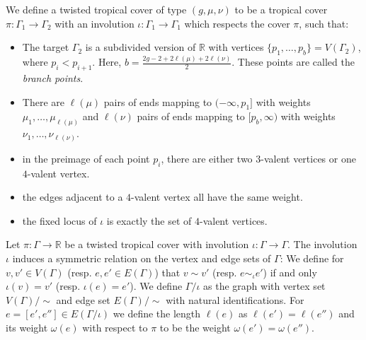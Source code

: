 \begin{defi}\label{def-twistedtropcover}
We define a twisted tropical cover of type $(g,\mu,\nu)$ to be a tropical cover $\pi\colon\Gamma_1\to\Gamma_2$ with an involution $\iota\colon\Gamma_1\to\Gamma_1$ which respects the cover $\pi$, such that:
\begin{itemize}
    \item The target $\Gamma_2$ is a subdivided version of $\mathbb{R}$ with vertices $\{p_1,\dots,p_b\}=V(\Gamma_2)$, where $p_i<p_{i+1}$. Here, $b=\frac{2g-2+2\ell(\mu)+2\ell(\nu)}{2}$. These points are called the \emph{branch points}.
    \item There are $\ell(\mu)$ pairs of ends mapping to $(-\infty,p_1]$ with weights $\mu_1,\dots,\mu_{\ell(\mu)}$ and $\ell(\nu)$ pairs of ends mapping to $[p_b,\infty)$ with weights $\nu_1,\ldots,\nu_{\ell(\nu)}$.
    \item in the preimage of each point $p_i$, there are either two $3$-valent vertices or one $4$-valent vertex.
    \item the edges adjacent to a $4$-valent vertex all have the same weight.
    \item the fixed locus of $\iota$ is exactly the set of $4$-valent vertices.
\end{itemize}
\end{defi}

\begin{defi}
Let $\pi\colon \Gamma\to \mathbb{R}$ be a twisted tropical cover with involution $\iota\colon\Gamma\to\Gamma$. The involution $\iota$ induces a symmetric relation on the vertex and edge sets of $\Gamma$: We define for $v,v'\in V(\Gamma)$  (resp. $e,e'\in E(\Gamma)$) that $v\sim v'$ (resp. $e\sim_\iota e'$) if and only $\iota(v)=v'$ (resp. $\iota(e)=e'$). We define $\Gamma/\iota$ as the graph with vertex set $V(\Gamma)/\sim$ and edge set $E(\Gamma)/\sim$ with natural identifications. For $e=[e',e'']\in E(\Gamma/\iota)$ we define the length $\ell(e)$ as $\ell(e')=\ell(e'')$ and its weight $\omega(e)$ with respect to $\pi$ to be the weight $\omega(e')=\omega(e'')$.
\end{defi}

